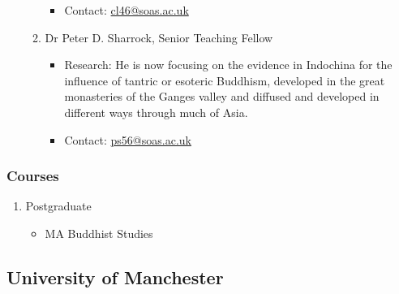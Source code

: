 \documentclass[a4paper,10.5pt]{article}
\begin{document}
\begin{enumerate}
\begin{enumerate}
\begin{itemize}
\item Contact: \href{mailto:cl46@soas.ac.uk}{cl46@soas.ac.uk}\\
\end{itemize}
\item Dr Peter D. Sharrock, Senior Teaching Fellow
\label{sec:orga19589c}
\begin{itemize}
\item Research: He is now focusing on the evidence in Indochina for the influence of tantric or esoteric Buddhism, developed in the great monasteries of the Ganges valley and diffused and developed in different ways through much of Asia.\\
\item Contact: \href{mailto:ps56@soas.ac.uk}{ps56@soas.ac.uk}\\
\end{itemize}
\end{enumerate}
\end{enumerate}
\subsubsection{Courses}
\label{sec:org304f46d}
\begin{enumerate}
\item Postgraduate
\label{sec:org08e3154}
\begin{itemize}
\item MA Buddhist Studies\\
\end{itemize}
\end{enumerate}
\subsection{University of Manchester}
\label{sec:orgb2dd38e}
\end{document}
